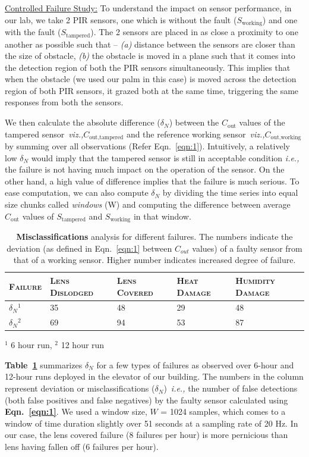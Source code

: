 \documentclass[manuscript]{acmart}
\newcommand{\viz}{{\it viz.,}\xspace}
\newcommand{\ie}{{\it i.e.,}\xspace}
\newcommand{\ca}{{\it (a) }}
\newcommand{\cb}{{\it (b) }}
\newcommand{\cout}{$C_{\text{out}}$\xspace}
\newcommand{\tampered}{$S_{\text{tampered}}$\xspace}
\newcommand{\working}{$S_{\text{working}}$\xspace}
\newcommand{\couttampered}{$C_{\text{out,tampered}}$\xspace}
\newcommand{\coutworking}{$C_{\text{out,working}}$\xspace}
\begin{document}
\noindent \underline{Controlled Failure Study:} To understand the impact on sensor performance, in our lab, we take 2 PIR sensors, one which is without the fault (\working) and one with the fault (\tampered). The 2 sensors are placed in as close a proximity to one another as possible such that -- \ca distance between the sensors are closer than the size of obstacle, \cb the obstacle is moved in a plane such that it comes into the detection region of both the PIR sensors simultaneously. This implies that when the obstacle (we used our palm in this case) is moved across the detection region of both PIR sensors, it grazed both at the same time, triggering the same responses from both the sensors.

We then calculate the absolute difference ($\delta_N$) between the \cout values of the tampered sensor~\viz  \couttampered and the reference working sensor~\viz \coutworking by summing over all observations (Refer Eqn.~\ref{eqn:1}). Intuitively, a relatively low $\delta_N$ would imply that the tampered sensor is still in acceptable condition \ie the failure is not having much impact on the operation of the sensor. On the other hand, a high value of difference implies that the failure is much serious. To ease computation, we can also compute $\delta_N$ by dividing the time series into equal size chunks called \textit{windows} (W) and computing the difference between average \cout values of \tampered and \working in that window.

\begin{table}\small
	\centering
	\caption{\textbf{Misclassifications} analysis for different failures. The numbers indicate the deviation (as defined in Eqn.~\ref{eqn:1} between $C_{out}$ values) of a faulty sensor from that of a working sensor. Higher number indicates increased degree of failure.}
	\begin{tabular}{lllll}
		\hline
		\bfseries \textsc{Failure} & \bfseries \textsc{Lens Dislodged} & \bfseries \textsc{Lens Covered} & \bfseries \textsc{Heat Damage} & \bfseries \textsc{Humidity Damage}\\
		\hline \hline
		\rowcolor{gray!20} $\delta_N$$^1$ & 35 & 48 & 29 & 48 \\
		$\delta_N$$^2$ & 69 & 94  & 53 & 87 \\
		\hline 
	\end{tabular}
	\label{tbl:fault_degree}
	\quad \raggedright
	$^1$ 6 hour run, $^2$ 12 hour run
\end{table} 

\textbf{Table~\ref{tbl:fault_degree}} summarizes $\delta_N$ for a few types of failures as observed over 6-hour and 12-hour runs deployed in the elevator of our building. The numbers in the column represent deviation or misclassifications ($\delta_N$)~\ie the number of false detections (both false positives and false negatives) by the faulty sensor calculated using {\bfseries Eqn.~\ref{eqn:1}}.
We used a window size, $W$ = 1024 samples, which comes to a window of time duration slightly over 51 seconds at a sampling rate of 20 Hz.
In our case, the lens covered failure (8 failures per hour) is more pernicious than lens having fallen off (6 failures per hour).
\end{document}
